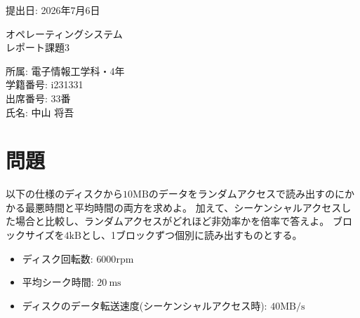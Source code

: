 \documentclass[a4paper,11pt,openany]{ltjsreport}
\begin{document}
\setcounter{page}{1}


% 

\begin{titlepage}
	\begin{flushright}
		\large{提出日: 2026年7月6日}
	\end{flushright}
	\begin{center}
		{\huge オペレーティングシステム} \\
		{\vspace{1cm}}
		{\huge レポート課題3}
	\end{center}
	\begin{center}
		{\large 所属: 電子情報工学科・4年} \\
		\vspace{0.5cm}
		{\large 学籍番号: i231331} \\
		\vspace{0.5cm}
		{\large 出席番号: 33番} \\
		\vspace{0.5cm}
		{\large 氏名: 中山 将吾}
	\end{center}
\end{titlepage}

\section*{問題}
以下の仕様のディスクから$10\mathrm{MB}$のデータをランダムアクセスで読み出すのにかかる最悪時間と平均時間の両方を求めよ。
加えて、シーケンシャルアクセスした場合と比較し、ランダムアクセスがどれほど非効率かを倍率で答えよ。
ブロックサイズを$4\mathrm{kB}$とし、1ブロックずつ個別に読み出すものとする。
\begin{itemize}
	\item ディスク回転数: $6000\mathrm{rpm}$
	\item 平均シーク時間: $\SI{20}{\ms}$
	\item ディスクのデータ転送速度(シーケンシャルアクセス時): $40\mathrm{MB/s}$
\end{itemize}
\end{document}
